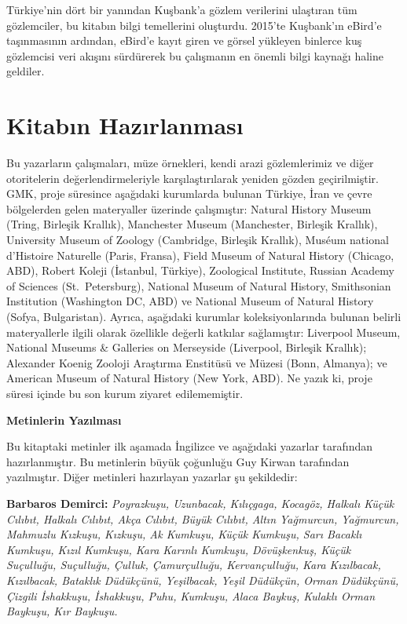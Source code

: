 \documentclass[
  10.5pt,
  a4paper,
  DIV=11,
  numbers=noendperiod,
  twocolumn]{scrreprt}
\begin{document}
Türkiye'nin dört bir yanından Kuşbank'a gözlem verilerini ulaştıran tüm
gözlemciler, bu kitabın bilgi temellerini oluşturdu. 2015'te Kuşbank'ın
eBird'e taşınmasının ardından, eBird'e kayıt giren ve görsel yükleyen
binlerce kuş gözlemcisi veri akışını sürdürerek bu çalışmanın en önemli
bilgi kaynağı haline geldiler.

\chapter*{Kitabın Hazırlanması}\label{kitabux131n-hazux131rlanmasux131}


Bu yazarların çalışmaları, müze örnekleri, kendi arazi gözlemlerimiz ve
diğer otoritelerin değerlendirmeleriyle karşılaştırılarak yeniden gözden
geçirilmiştir. GMK, proje süresince aşağıdaki kurumlarda bulunan
Türkiye, İran ve çevre bölgelerden gelen materyaller üzerinde
çalışmıştır: Natural History Museum (Tring, Birleşik Krallık),
Manchester Museum (Manchester, Birleşik Krallık), University Museum of
Zoology (Cambridge, Birleşik Krallık), Muséum national d'Histoire
Naturelle (Paris, Fransa), Field Museum of Natural History (Chicago,
ABD), Robert Koleji (İstanbul, Türkiye), Zoological Institute, Russian
Academy of Sciences (St.~Petersburg), National Museum of Natural
History, Smithsonian Institution (Washington DC, ABD) ve National Museum
of Natural History (Sofya, Bulgaristan). Ayrıca, aşağıdaki kurumlar
koleksiyonlarında bulunan belirli materyallerle ilgili olarak özellikle
değerli katkılar sağlamıştır: Liverpool Museum, National Museums \&
Galleries on Merseyside (Liverpool, Birleşik Krallık); Alexander Koenig
Zooloji Araştırma Enstitüsü ve Müzesi (Bonn, Almanya); ve American
Museum of Natural History (New York, ABD). Ne yazık ki, proje süresi
içinde bu son kurum ziyaret edilememiştir.

\textbf{Metinlerin Yazılması}

Bu kitaptaki metinler ilk aşamada İngilizce ve aşağıdaki yazarlar
tarafından hazırlanmıştır. Bu metinlerin büyük çoğunluğu Guy Kirwan
tarafından yazılmıştır. Diğer metinleri hazırlayan yazarlar şu
şekildedir:

\textbf{Barbaros Demirci:} \emph{Poyrazkuşu, Uzunbacak, Kılıçgaga,
Kocagöz, Halkalı Küçük Cılıbıt, Halkalı Cılıbıt, Akça Cılıbıt, Büyük
Cılıbıt, Altın Yağmurcun, Yağmurcun, Mahmuzlu Kızkuşu, Kızkuşu, Ak
Kumkuşu, Küçük Kumkuşu, Sarı Bacaklı Kumkuşu, Kızıl Kumkuşu, Kara
Karınlı Kumkuşu, Dövüşkenkuş, Küçük Suçulluğu, Suçulluğu, Çulluk,
Çamurçulluğu, Kervançulluğu, Kara Kızılbacak, Kızılbacak, Bataklık
Düdükçünü, Yeşilbacak, Yeşil Düdükçün, Orman Düdükçünü, Çizgili
İshakkuşu, İshakkuşu, Puhu, Kumkuşu, Alaca Baykuş, Kulaklı Orman
Baykuşu, Kır Baykuşu.}
\end{document}
